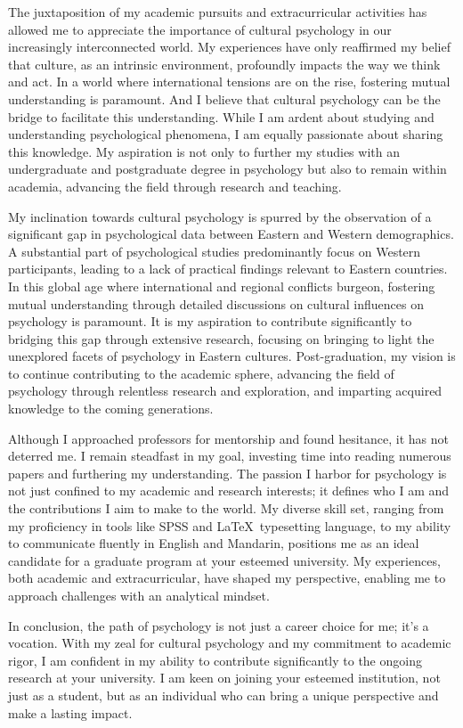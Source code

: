 \documentclass[]{article}
\begin{document}
The juxtaposition of my academic pursuits and extracurricular activities has allowed me to appreciate the importance of cultural psychology in our increasingly interconnected world.
My experiences have only reaffirmed my belief that culture, as an intrinsic environment, profoundly impacts the way we think and act.
In a world where international tensions are on the rise, fostering mutual understanding is paramount.
And I believe that cultural psychology can be the bridge to facilitate this understanding.
While I am ardent about studying and understanding psychological phenomena, I am equally passionate about sharing this knowledge.
My aspiration is not only to further my studies with an undergraduate and postgraduate degree in psychology but also to remain within academia, advancing the field through research and teaching.

My inclination towards cultural psychology is spurred by the observation of a significant gap in psychological data between Eastern and Western demographics.
A substantial part of psychological studies predominantly focus on Western participants, leading to a lack of practical findings relevant to Eastern countries.
In this global age where international and regional conflicts burgeon, fostering mutual understanding through detailed discussions on cultural influences on psychology is paramount.
It is my aspiration to contribute significantly to bridging this gap through extensive research, focusing on bringing to light the unexplored facets of psychology in Eastern cultures.
Post-graduation, my vision is to continue contributing to the academic sphere, advancing the field of psychology through relentless research and exploration, and imparting acquired knowledge to the coming generations.

Although I approached professors for mentorship and found hesitance, it has not deterred me.
I remain steadfast in my goal, investing time into reading numerous papers and furthering my understanding.
The passion I harbor for psychology is not just confined to my academic and research interests; it defines who I am and the contributions I aim to make to the world.
My diverse skill set, ranging from my proficiency in tools like SPSS and \LaTeX\ typesetting language, to my ability to communicate fluently in English and Mandarin, positions me as an ideal candidate for a graduate program at your esteemed university.
My experiences, both academic and extracurricular, have shaped my perspective, enabling me to approach challenges with an analytical mindset.

In conclusion, the path of psychology is not just a career choice for me; it's a vocation.
With my zeal for cultural psychology and my commitment to academic rigor, I am confident in my ability to contribute significantly to the ongoing research at your university.
I am keen on joining your esteemed institution, not just as a student, but as an individual who can bring a unique perspective and make a lasting impact.
\end{document}
